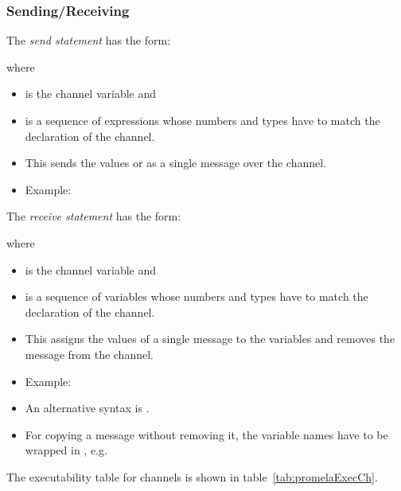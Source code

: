 			\subsubsection{Sending/Receiving}
				The \textit{send statement} has the form:
				\begin{center}
				\end{center}
				where
				\begin{itemize}
					\item {} is the channel variable and
					\item {} is a sequence of expressions whose numbers and types have to match the declaration of the channel.
					\item This sends the values or  as a single message over the channel.
					\item Example: 
				\end{itemize}
			
				The \textit{receive statement} has the form:
				\begin{center}
				\end{center}
				where
				\begin{itemize}
					\item {} is the channel variable and
					\item {} is a sequence of variables whose numbers and types have to match the declaration of the channel.
					\item This assigns the values of a single message to the variables  and removes the message from the channel.
					\item Example: 
					\item An alternative syntax is .
					\item For copying a message without removing it, the variable names have to be wrapped in \inlinePromela{< >}, e.g. 
				\end{itemize}
			
				The executability table for channels is shown in table~\ref{tab:promelaExecCh}.
				
